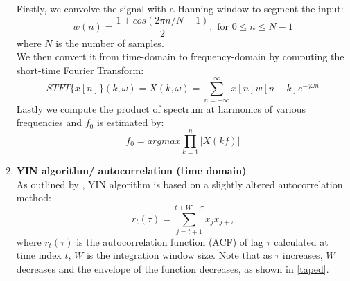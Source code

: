 \begin{enumerate}
    Firstly, we convolve the signal with a Hanning window to segment the input:
    \[w(n) = \frac{1+cos(2\pi n/N-1)}{2}, \text{ for } 0 \leq n \leq N-1\] where $N$ is the number of samples.\\
    We then convert it from time-domain to frequency-domain by computing the short-time Fourier Transform:
    \[STFT \{x[n]\}(k,\omega) = X(k,\omega )= \sum _{n=-\infty }^{\infty }x[n]w[n-k]e^{-j\omega n}\]
    Lastly we compute the product of spectrum at harmonics of various frequencies and $f_0$ is estimated by:
    \[f_0 = argmax\prod_{k=1}^{n}|X(kf)|\] 

    \item \textbf{YIN algorithm/ autocorrelation (time domain)}\\
    As outlined by \cite{yin}, YIN algorithm is based on a slightly altered autocorrelation method:
    \[r_t(\tau)=\sum_{j=t+1}^{t+W-\tau}x_j x_{j+\tau}\]
    where $r_t(\tau)$ is the autocorrelation function (ACF) of lag $\tau$ calculated at time index $t$, $W$ is the integration
    window size. Note that as $\tau$ increases, $W$ decreases and the envelope of the function decreases, as shown in \cref{taped}.


\end{enumerate}
